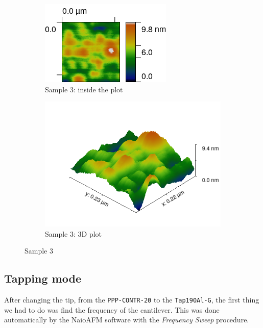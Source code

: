 \documentclass[11pt,a4paper]{article}
\begin{document}
\begin{figure}[H]
\centering
\begin{subfigure}[b]{0.45\textwidth}
\includegraphics[width=\textwidth]{sm_sample3}
\caption{Sample 3: inside the plot}
\end{subfigure}
\begin{subfigure}[b]{0.45\textwidth}
\includegraphics[width=\textwidth]{sm_sample3_3D_improved}
\caption{Sample 3: 3D plot}
\end{subfigure}
\caption{Sample 3}
\label{fig:sample3_light_green}
\end{figure}

\subsection{Tapping mode}
After changing the tip, from the \texttt{PPP-CONTR-20} to the \texttt{Tap190Al-G}, the first thing we had to do was find the frequency of the cantilever. This was done automatically by the NaioAFM software with the \emph{Frequency Sweep} procedure.
\end{document}
